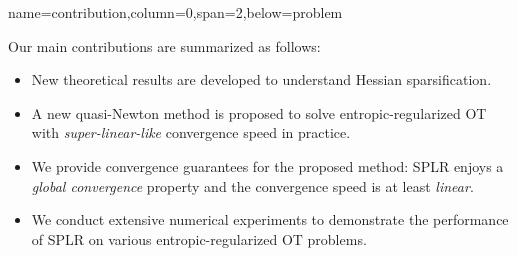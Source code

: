 {name=contribution,column=0,span=2,below=problem}
{
    Our main contributions are summarized as follows:
    \begin{itemize}
        \item New theoretical results are developed to understand Hessian sparsification.
        \item A new quasi-Newton method is proposed to solve entropic-regularized OT with \emph{super-linear-like} convergence speed in practice.
        \item We provide convergence guarantees for the proposed method: SPLR enjoys a \emph{global convergence} property and the convergence speed is at least \emph{linear}.
        \item We conduct extensive numerical experiments to demonstrate the performance of SPLR on various entropic-regularized OT problems.
    \end{itemize}
}